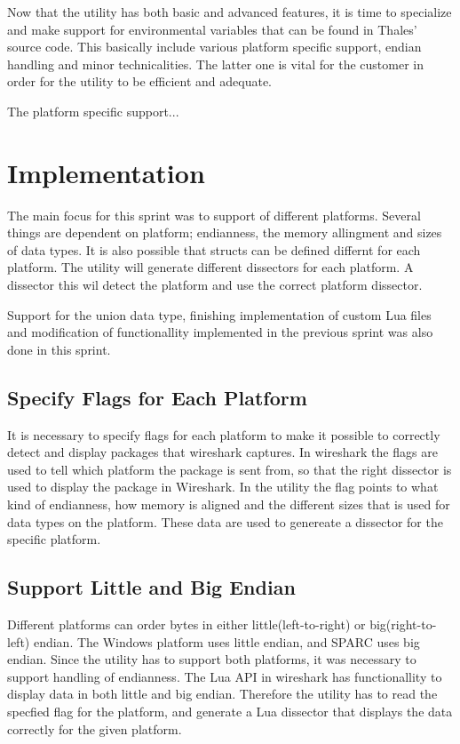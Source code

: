 Now that the utility has both basic and advanced features, it is time to specialize and make support for environmental variables that can be found in Thales' source code. This basically include various platform specific support, endian handling and minor technicalities. The latter one is vital for the customer in order for the utility to be efficient and adequate.

The platform specific support...

\section{Implementation}
The main focus for this sprint was to support of different platforms. Several 
things are dependent on platform; endianness, the memory allingment and sizes 
of data types. It is also possible that structs can be defined differnt for 
each platform. The utility will generate different dissectors for each 
platform. A dissector this wil detect the platform and use the correct 
platform dissector.

Support for the union data type, finishing implementation of custom Lua files 
and modification of functionallity implemented in the previous sprint was also 
done in this sprint.

\subsection{Specify Flags for Each Platform}
It is necessary to specify flags for each platform to make it possible to 
correctly detect and display packages that wireshark captures. In wireshark 
the flags are used to tell which platform the package is sent from, so that 
the right dissector is used to display the package in Wireshark. In the 
utility the flag points to what kind of endianness, how memory is aligned and 
the different sizes that is used for data types on the platform. These data 
are used to genereate a dissector for the specific platform.

\subsection{Support Little and Big Endian}
Different platforms can order bytes in either little(left-to-right) or 
big(right-to-left) endian. The Windows platform uses little endian, and SPARC 
uses big endian. Since the utility has to support both platforms, it was 
necessary to support handling of endianness. The Lua API in wireshark has 
functionallity to display data in both little and big endian. Therefore the 
utility has to read the specfied flag for the platform, and generate a Lua 
dissector that displays the data correctly for the given platform.

